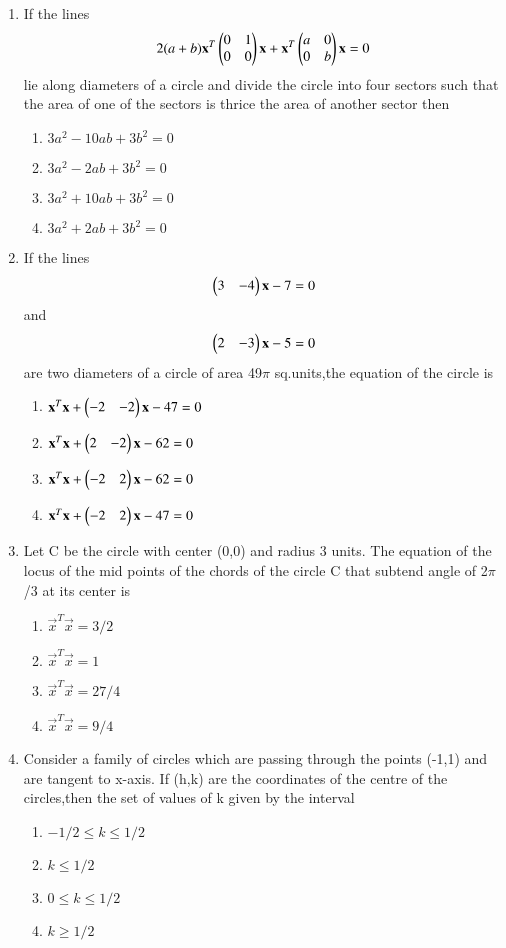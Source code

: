 \begin{enumerate}[label=\arabic*.,ref=\thesubsection.\theenumi]
\item If the lines 
\begin{align}
2(a+b)\mathbf x^T \begin{pmatrix}0 & 1 \\ 0 & 0\end{pmatrix}  \mathbf x+\mathbf x^T \begin{pmatrix} a & 0 \\ 0 & b\end{pmatrix}  \mathbf x=0
\end{align} 
lie along diameters of a circle and divide the circle into four sectors such that the area of one of the sectors is thrice the area of another sector then
\begin{enumerate}
\item $3a^2-10ab+3b^2=0$
\item $3a^2-2ab+3b^2=0$
\item $3a^2+10ab+3b^2=0$
\item $3a^2+2ab+3b^2=0$
\end{enumerate}
     
\item If the lines 
\begin{align}
\begin{pmatrix}3&-4\end{pmatrix}\mathbf x-7=0
\end{align}
and 
\begin{align}
\begin{pmatrix}2&-3\end{pmatrix}\mathbf x-5=0
\end{align} 
are two diameters of a circle of area 49$\pi$ sq.units,the equation of the circle is
\begin{enumerate}    
\item $\mathbf x^T\mathbf x + \begin{pmatrix}-2&-2\end{pmatrix}\mathbf x-47=0$ 
\item $\mathbf x^T\mathbf x + \begin{pmatrix}2&-2\end{pmatrix}\mathbf x-62=0$ 
\item $\mathbf x^T\mathbf x + \begin{pmatrix}-2&2\end{pmatrix}\mathbf x-62=0$ 
\item $\mathbf x^T\mathbf x + \begin{pmatrix}-2&2\end{pmatrix}\mathbf x-47=0$
\end{enumerate}
     
\item Let C be the circle with center (0,0) and radius 3 units. The equation of the locus of the mid points of the chords of the circle C that subtend angle of 2$\pi$/3 at its center is
\begin{enumerate}    
\item $\vec x^T\vec x=3/2$
\item $\vec x^T\vec x=1$
\item $\vec x^T\vec x=27/4$
\item $\vec x^T\vec x=9/4$
\end{enumerate}
     
\item Consider a family of circles which are passing through the points (-1,1) and are tangent to x-axis. If (h,k) are the coordinates of the centre of the circles,then the set of values of k given by the interval
\begin{enumerate}
\item $-1/2\leq k\leq1/2$
\item $k\leq1/2$
\item $0\leq k\leq1/2$
\item $k\geq1/2$
\end{enumerate}
     

\end{enumerate}
